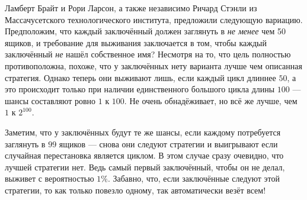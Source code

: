 Ламберт Брайт и Рори Ларсон, а также независимо Ричард Стэнли из Массачусетского технологического института, предложили следующую вариацию.
Предположим, что каждый заключённый должен заглянуть в \emph{не менее} чем 50 ящиков, и требование для выживания заключается в том, чтобы каждый заключённый \emph{не} нашёл собственное имя?
Несмотря на то, что цель полностью противоположна, похоже, что у заключённых нету варианта лучше чем описанная стратегия.
Однако теперь они выживают лишь, если каждый цикл длиннее $50$, а это происходит только при наличии единственного большого цикла длины $100$ --- шансы составляют ровно $1$ к $100$.
Не очень обнадёживает, но всё же лучше, чем $1$ к $2^{100}$.

Заметим, что у заключённых будут те же шансы, если каждому потребуется заглянуть в $99$ ящиков --- снова они следуют стратегии и выигрывают если случайная перестановка является циклом.
В этом случае сразу очевидно, что лучшей стратегии нет.
Ведь самый первый заключённый, чтобы он не делал, выживет с вероятностью $1\%$.
Забавно, что, если заключённые следуют этой стратегии, то как только повезло одному, так автоматически везёт всем!
